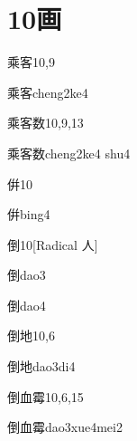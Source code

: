 
\section*{10画}

\begin{entry}{乘客}{10,9}
  \begin{phonetics}{乘客}{cheng2ke4}
  \end{phonetics}
\end{entry}

\begin{entry}{乘客数}{10,9,13}
  \begin{phonetics}{乘客数}{cheng2ke4 shu4}
  \end{phonetics}
\end{entry}

\begin{entry}{倂}{10}
  \begin{phonetics}{倂}{bing4}
  \end{phonetics}
\end{entry}

\begin{entry}{倒}{10}[Radical 人]
  \begin{phonetics}{倒}{dao3}
  \end{phonetics}
  \begin{phonetics}{倒}{dao4}
  \end{phonetics}
\end{entry}

\begin{entry}{倒地}{10,6}
  \begin{phonetics}{倒地}{dao3di4}
  \end{phonetics}
\end{entry}

\begin{entry}{倒血霉}{10,6,15}
  \begin{phonetics}{倒血霉}{dao3xue4mei2}
  \end{phonetics}
\end{entry}

